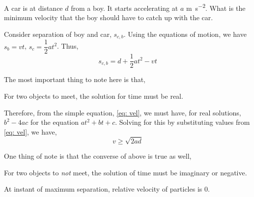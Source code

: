 \begin{example}
    A car is at distance \(d\) from a boy. It starts accelerating at \(a\) \unit{\metre\per\second\squared}. What is the minimum velocity that the boy should
    have to catch up with the car.
    \begin{soln}
        Consider separation of boy and car, \(s_{c,b}\). Using the equations of motion, 
        we have \(s_{b} = vt\), \(s_{c} = \dfrac{1}{2}at^2\). Thus, 
        \begin{equation}
            \label{eq: vel}
            s_{c,b} = d + \frac{1}{2}at^2 - vt        
        \end{equation}
    
        The most important thing to note here is that, 
        \begin{moral}
            For two objects to meet, the solution for time must be real.
        \end{moral}
        Therefore, from the simple equation, \eqref{eq: vel}, we must have, for real solutions,
        \(b^2 - 4ac\) for the equation \(at^2 + bt + c\). Solving for this by substituting values from
        \eqref{eq: vel}, we have,
            \begin{equation}
                v \ge \sqrt{2ad}
            \end{equation}
    \end{soln}
\end{example}

\begin{remark}
    One thing of note is that the converse of above is true as well,
    \begin{moral}
        For two objects to \emph{not} meet, the solution of time must be imaginary or negative.    
    \end{moral}
\end{remark}


\begin{moral}
    At instant of maximum separation, relative velocity of particles is \(0\).
\end{moral}

